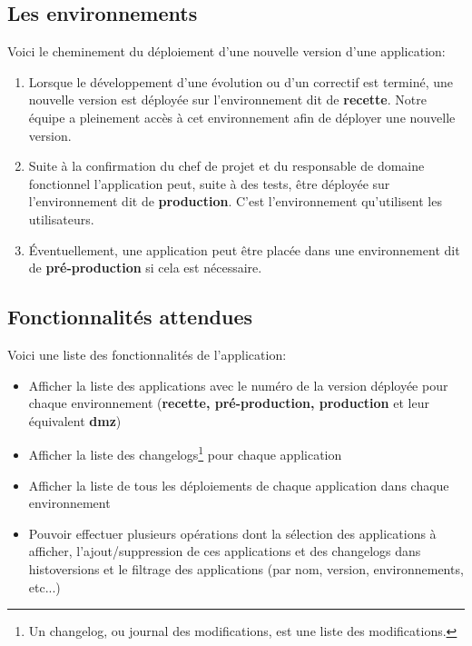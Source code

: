 \documentclass[12pt]{report}
\begin{document}
    \subsection{Les environnements}
    Voici le cheminement du déploiement d'une nouvelle version d'une application:\vspace{-1em}
    \begin{enumerate}
        \item Lorsque le développement d'une évolution ou d'un correctif est terminé, une nouvelle version est déployée sur l'environnement dit de \textbf{recette}. Notre équipe a pleinement accès à cet environnement afin de déployer une nouvelle version.
        \item Suite à la confirmation du chef de projet et du responsable de domaine fonctionnel l'application peut, suite à des tests, être déployée sur l'environnement dit de \textbf{production}. C'est l'environnement qu'utilisent les utilisateurs.
        \item Éventuellement, une application peut être placée dans une environnement dit de \textbf{pré-production} si cela est nécessaire.
    \end{enumerate}
    
    \subsection{Fonctionnalités attendues}
    Voici une liste des fonctionnalités de l'application:\vspace{-1em}
    \begin{itemize}
        \item Afficher la liste des applications avec le numéro de la version déployée pour chaque environnement (\textbf{recette, pré-production, production} et leur équivalent \textbf{\gls{dmz}})
        \item Afficher la liste des changelogs\footnote{Un changelog, ou journal des modifications, est une liste des modifications\cite{wiki:changelog}.} pour chaque application
        \item Afficher la liste de tous les déploiements de chaque application dans chaque environnement
        \item Pouvoir effectuer plusieurs opérations dont la sélection des applications à afficher, l'ajout/suppression de ces applications et des changelogs dans histoversions et le filtrage des applications (par nom, version, environnements, etc...)
    \end{itemize}
    
\end{document}
